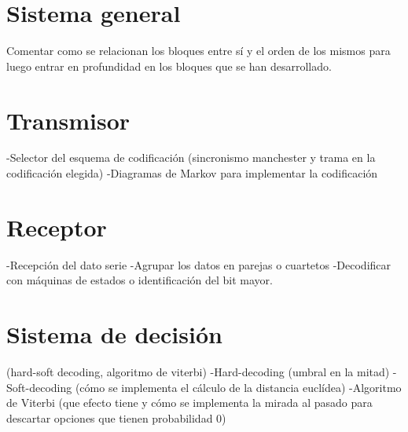 
\label{chp:App2}
\minitoc

\section{Sistema general}
Comentar como se relacionan los bloques entre sí y el orden de los mismos para luego entrar en profundidad en 
los bloques que se han desarrollado.

\section{Transmisor}
		-Selector del esquema de codificación (sincronismo manchester y trama en la codificación elegida)
		-Diagramas de Markov para implementar la codificación

\section{Receptor}
		-Recepción del dato serie
		-Agrupar los datos en parejas o cuartetos
		-Decodificar con máquinas de estados o identificación del bit mayor.

\section{Sistema de decisión} (hard-soft decoding, algoritmo de viterbi)
		-Hard-decoding (umbral en la mitad)
		-Soft-decoding (cómo se implementa el cálculo de la distancia euclídea)
		-Algoritmo de Viterbi (que efecto tiene y cómo se implementa la mirada al pasado para descartar opciones que tienen probabilidad 0)
\chapterend{}